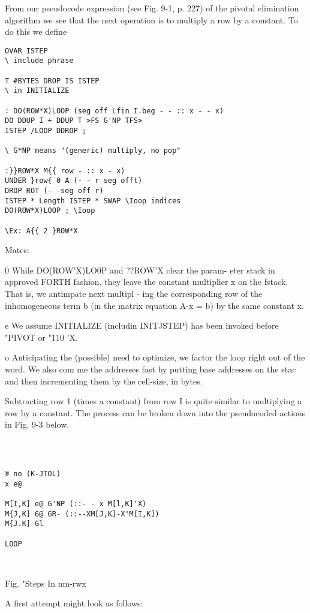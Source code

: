 {{From our pseudocode expression (see Fig. 9-1, p. 227) of the
pivotal elimination algorithm we see that the next operation is to
multiply a row by a constant. To do this we define

\begin{verbatim}
OVAR ISTEP
\ include phrase

T #BYTES DROP IS ISTEP
\ in INITIALIZE

: DO(ROW*X)LOOP (seg off Lfin I.beg - - :: x - - x)
DO DDUP I + DDUP T >FS G'NP TFS>
ISTEP /LOOP DDROP ;

\ G*NP means "(generic) multiply, no pop"

:}}ROW*X M{{ row - :: x - x)
UNDER }row{ 0 A (- - r seg offt)
DROP ROT (- -seg off r)
ISTEP * Length ISTEP * SWAP \Ioop indices
DO(ROW*X)LOOP ; \Ioop

\Ex: A{{ 2 }ROW*X

\end{verbatim}
Mates:

0 While DO(ROW'X)LO0P and ??ROW'X clear the param-
eter stack in approved FORTH fashion, they leave the constant
multiplier x on the fstack. That is, we antimpate next multipl -
ing the corresponding row of the inhomogeneous term b (in
the matrix equation A-x = b) by the same constant x.

e We assume INITIALIZE (includin INITJSTEP) has been
invoked before "PIVOT or "110 'X.

o Anticipating the (possible) need to optimize, we factor the loop
right out of the word. We also com me the addresses fast by
putting base addresses on the stac and then incrementing
them by the cell-size, in bytes.


Subtracting row 1 (times a constant) from row I is quite similar to
multiplying a row by a constant. The process can be broken down
into the pseudocoded actions in Fig, 9-3 below.

 
\begin{verbatim}

 

® no (K-JTOL)
x e@

M[I,K] e@ G'NP (::- - x M[l,K]'X)
M{J,K] 6@ GR- (::--XM[J,K]-X'M[I,K])
M{J.K] Gl

LOOP

 

\end{verbatim} 

Fig. "Steps In nm-rwx

A first attempt might look as follows:

}}
